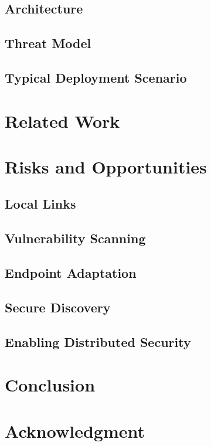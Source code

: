 \documentclass[conference]{IEEEtran}
\begin{document}
\subsection{Architecture}


\subsection{Threat Model}


\subsection{Typical Deployment Scenario}


\section{Related Work}


\section{Risks and Opportunities}
\label{sec-risks-opportunities}

\subsection{Local Links}


\subsection{Vulnerability Scanning}


\subsection{Endpoint Adaptation}


\subsection{Secure Discovery}


\subsection{Enabling Distributed Security}


\section{Conclusion}


\section*{Acknowledgment}




\end{document}
